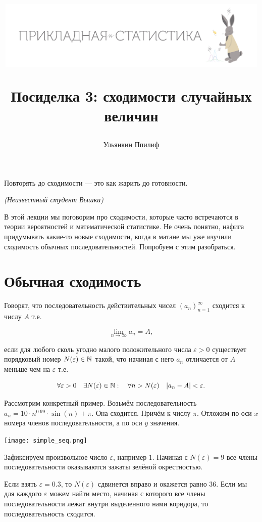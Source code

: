 \documentclass[12pt, a4paper, oneside]{article}
\title{
\begin{center} 
\includegraphics[width=0.99\textwidth]{logo.png}
\end{center}

Посиделка 3: сходимости случайных величин}
\date{ } %
\author{Ульянкин Ппилиф}
\begin{document}

\maketitle

\epigraph{Повторять до сходимости --- это как жарить до готовности.}{\textit{(Неизвестный студент Вышки)}}

В этой лекции мы поговорим про сходимости, которые часто встречаются в теории вероятностей и математической статистике. Не очень понятно, нафига придумывать какие-то новые сходимости, когда в матане мы уже изучили сходимость обычных последовательностей. Попробуем с этим разобраться. 


\section{Обычная сходимость}

Говорят, что последовательность действительных чисел $(a_n)_{n=1}^{\infty}$ сходится к числу $A$ т.е.

\[ 
\lim_{n \to \infty} a_n = A,
\]

если для любого сколь угодно малого положительного числа $\varepsilon > 0$ существует порядковый номер $N(\varepsilon) \in \mathbb N$ такой, что начиная с него $a_n$ отличается от $A$ меньше чем на $\varepsilon$ т.е. 

\[
\forall \varepsilon > 0 \quad  \exists N(\varepsilon) \in \mathbb N : \quad  \forall n > N(\varepsilon) \quad |a_n - A| < \varepsilon.
\]

Рассмотрим конкретный пример. Возьмём последовательность $a_n = 10 \cdot n^{0.99} \cdot \sin(n) + \pi.$ Она сходится. Причём к числу $\pi$. Отложим по оси $x$ номера членов последовательности, а по оси $y$ значения. 

\begin{center} 
\texttt{[image: simple\_seq.png]}
\end{center} 

Зафиксируем произвольное число $\varepsilon$, например $1$. Начиная с $N(\varepsilon) = 9$ все члены последовательности оказываются зажаты зелёной окрестностью. 

Если взять $\varepsilon = 0.3$, то $N(\varepsilon)$ сдвинется вправо и окажется равно $36$. Если мы для каждого $\varepsilon$ можем найти место, начиная с которого все члены последовательности лежат внутри выделенного нами коридора, то последовательность сходится.
\end{document}
